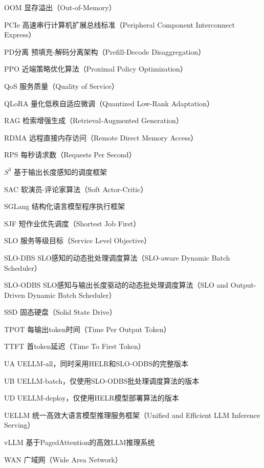 \begin{denotation}[3cm]
  \item[OOM]显存溢出（Out-of-Memory）
  \item[PCIe]高速串行计算机扩展总线标准（Peripheral Component Interconnect Express）
  \item[PD分离]预填充-解码分离架构（Prefill-Decode Disaggregation）
  \item[PPO]近端策略优化算法（Proximal Policy Optimization）
  \item[QoS]服务质量（Quality of Service）
  \item[QLoRA]量化低秩自适应微调（Quantized Low-Rank Adaptation）
  \item[RAG]检索增强生成（Retrieval-Augmented Generation）
  \item[RDMA]远程直接内存访问（Remote Direct Memory Access）
  \item[RPS]每秒请求数（Requests Per Second）
  \item[$S^3$]基于输出长度感知的调度框架\cite{jin2023s3}
  \item[SAC]软演员-评论家算法（Soft Actor-Critic）
  \item[SGLang]结构化语言模型程序执行框架\cite{zheng2024sglang}
  \item[SJF]短作业优先调度（Shortest Job First）
  \item[SLO]服务等级目标（Service Level Objective）
  \item[SLO-DBS]SLO感知的动态批处理调度算法（SLO-aware Dynamic Batch Scheduler）
  \item[SLO-ODBS]SLO感知与输出长度驱动的动态批处理调度算法（SLO and Output-Driven Dynamic Batch Scheduler）
  \item[SSD]固态硬盘（Solid State Drive）
  \item[TPOT]每输出token时间（Time Per Output Token）
  \item[TTFT]首token延迟（Time To First Token）
  \item[UA]UELLM-all，同时采用HELR和SLO-ODBS的完整版本
  \item[UB]UELLM-batch，仅使用SLO-ODBS批处理调度算法的版本
  \item[UD]UELLM-deploy，仅使用HELR模型部署算法的版本
  \item[UELLM]统一高效大语言模型推理服务框架（Unified and Efficient LLM Inference Serving）
  \item[vLLM]基于PagedAttention的高效LLM推理系统\cite{kwon2023efficient}
  \item[WAN]广域网（Wide Area Network）


\end{denotation}

